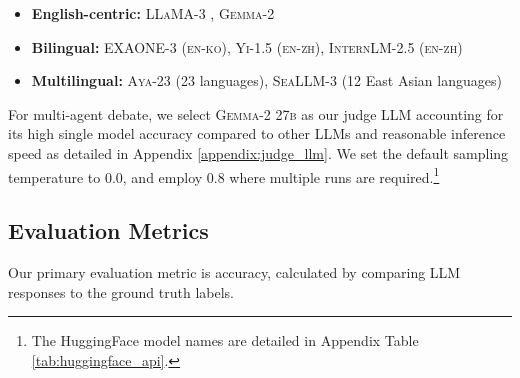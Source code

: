 \begin{itemize}[leftmargin=*, itemsep=2pt, parsep=-1pt]
 \item \textbf{English-centric:} \textsc{LLaMA-3} \cite{grattafiori2024llama3herdmodels}, \textsc{Gemma-2} \cite{gemma2}
 \item \textbf{Bilingual:} \textsc{EXAONE-3} \cite{exaone} (\textsc{en-ko}), \textsc{Yi-1.5} \cite{yi} (\textsc{en-zh}), \textsc{InternLM-2.5} \cite{internlm} (\textsc{en-zh})
 \item \textbf{Multilingual:} \textsc{Aya-23} \cite{aya23} (23 languages), \textsc{SeaLLM-3} \cite{seallm} (12 East Asian languages)
\end{itemize}
For multi-agent debate, we select \textsc{Gemma-2 27b} as our judge LLM accounting for its high single model accuracy compared to other LLMs and reasonable inference speed as detailed in Appendix \ref{appendix:judge_llm}. We set the default sampling temperature to 0.0, and employ 0.8 where multiple runs are required.\footnote{The HuggingFace model names are detailed in Appendix Table \ref{tab:huggingface_api}.}




\subsection{Evaluation Metrics}
\label{sec:evaluation}
Our primary evaluation metric is accuracy, calculated by comparing LLM responses to the ground truth labels.




% 



